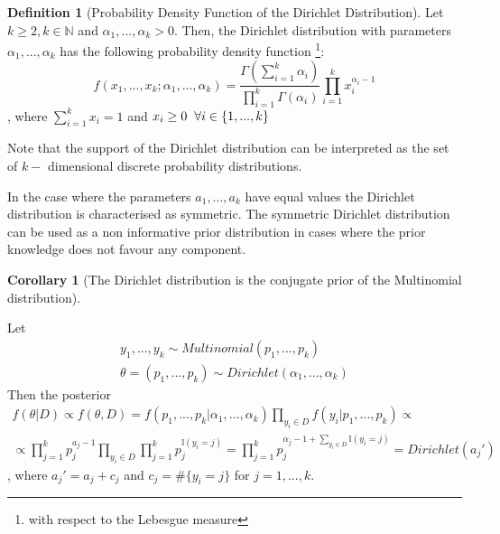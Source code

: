 \documentclass[12pt]{article}
\newtheorem{corollary}{Corollary}[theorem]
\theoremstyle{definition}
\newtheorem{definition}{Definition}[section]
\begin{document}
\begin{definition}[Probability Density Function of the Dirichlet Distribution]
    Let $k\geq 2, k\in \mathbb{N}$ and $\alpha_1,...,\alpha_k>0$. Then, the Dirichlet distribution with parameters $\alpha_1,...,\alpha_k$ has the following probability density function \footnote{with respect to the Lebesgue measure}:
    \begin{equation}\label{DirichletDensity}
    f(x_1,...,x_k;\alpha_1,...,\alpha_k)=\frac{\Gamma(\sum_{i=1}^k \alpha_i)}{\prod_{i=1}^k\Gamma(\alpha_i)}\prod_{i=1}^k x_i^{\alpha_i-1}
    \end{equation}, where $\sum_{i=1}^kx_i=1$ and $x_i\geq 0\hspace{0.2cm}\forall i\in\{1,...,k\}$   
\end{definition}
 
Note that the support of the Dirichlet distribution can be interpreted as the set of $k-$ dimensional discrete probability distributions. 

In the case where the parameters $a_1,...,a_k$ have equal values the Dirichlet distribution is characterised as symmetric. The symmetric Dirichlet distribution can be used as a non informative prior distribution in cases where the prior knowledge does not favour any component. 

\begin{corollary}[The Dirichlet distribution is the conjugate prior of the Multinomial distribution]
\end{corollary}

Let
\begin{equation*}
    \begin{aligned}
    y_1,...,y_k \sim Multinomial(p_1,...,p_k)\\
    \theta = (p_1,...,p_k) \sim Dirichlet(\alpha_1,...,\alpha_k)
    \end{aligned}
\end{equation*} 
Then the posterior
\begin{equation*}
    \begin{aligned}
    f(\theta|D) \propto f(\theta, D)
    =f(p_1,...,p_k|\alpha_1,...,\alpha_k)\prod_{y_i\in D} f(y_i|p_1,...,p_k)\propto \\
    \propto \prod_{j=1}^k p_j^{a_j-1}\prod_{y_i\in D}\prod_{j=1}^k p_j^{\mathbb{I}(y_i=j)}
    =\prod_{j=1}^k p_j^{\alpha_j -1 + \sum_{y_i\in D}\mathbb{I}(y_i =j)}
    =Dirichlet(a_j')
    \end{aligned}
\end{equation*}, where $a_j'=a_j + c_j$ and $c_j=\#\{y_i = j\}$ for $j=1,...,k$. 
\end{document}

